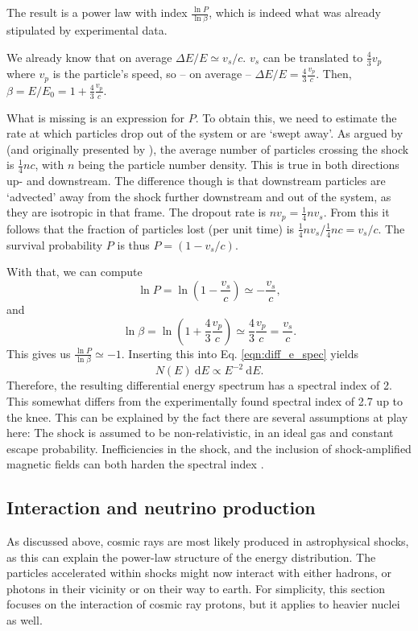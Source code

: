 \documentclass[
    a4paper, %
    fontsize=10pt, %
    twoside=false, %
    numbers=noenddot, %
    fontmethod=tex,
]{kaobook}
\begin{document}
The result is a power law with index $\frac{\ln P}{\ln \beta}$, which is indeed what was already stipulated by experimental data.

We already know that on average $\Delta E/E \simeq v_s/c$. $v_s$ can be translated to $\frac{4}{3} v_p$ where $v_p$ is the particle's speed, so -- on average -- $\Delta E/E = \frac{4}{3}\frac{v_p}{c}$. Then, $\beta = E/E_0 = 1 + \frac{4}{3}\frac{v_p}{c}$.

What is missing is an expression for $P$. To obtain this, we need to estimate the rate at which particles drop out of the system or are `swept away'. As argued by \cite{Longair2011} (and originally presented by ), the average number of particles crossing the shock is $\frac{1}{4} n c$, with $n$ being the particle number density. This is true in both directions up- and downstream. The difference though is that downstream particles are `advected' away from the shock further downstream and out of the system, as they are isotropic in that frame. The dropout rate is $nv_p=\frac{1}{4}nv_s$. From this it follows that the fraction of particles lost (per unit time) is $\frac{1}{4}nv_s/\frac{1}{4}nc = v_s/c$. The survival probability $P$ is thus $P=(1-v_s/c)$. 

With that, we can compute 
\begin{equation}
    \ln P = \ln ( 1-\frac{v_s}{c}) \simeq -\frac{v_s}{c},
\end{equation}
and 
\begin{equation}
   \ln \beta = \ln(1+\frac{4}{3}\frac{v_p}{c}) \simeq \frac{4}{3}\frac{v_p}{c} = \frac{v_s}{c}.
\end{equation}
This gives us $\frac{\ln P}{\ln \beta} \simeq -1$. Inserting this into Eq. \ref{eqn:diff_e_spec} yields
\begin{equation}
    N(E)~\text{d} E \propto E^{-2}~\text{d} E.
\end{equation}
Therefore, the resulting differential energy spectrum has a spectral index of 2. This somewhat differs from the experimentally found spectral index of 2.7 up to the knee. This can be explained by the fact there are several assumptions at play here: The shock is assumed to be non-relativistic, in an ideal gas and constant escape probability. Inefficiencies in the shock, and the inclusion of shock-amplified magnetic fields can both harden the spectral index \cite{Spurio2018}.

\subsection{Interaction and neutrino production} \label{cr_interactions}
As discussed above, cosmic rays are most likely produced in astrophysical shocks, as this can explain the power-law structure of the energy distribution. The particles accelerated within shocks might now interact with either hadrons, or photons in their vicinity or on their way to earth. For simplicity, this section focuses on the interaction of cosmic ray protons, but it applies to heavier nuclei as well.
\end{document}
